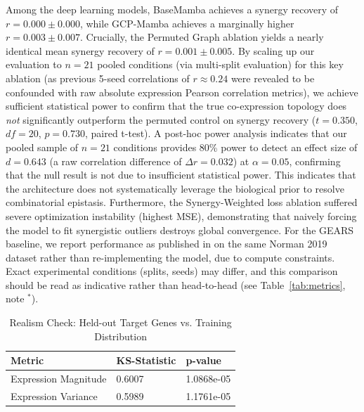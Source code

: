 \documentclass{bioinfo}
\begin{document}
Among the deep learning models, BaseMamba achieves a synergy recovery of $r = 0.000 \pm 0.000$, while GCP-Mamba achieves a marginally higher $r = 0.003 \pm 0.007$. Crucially, the Permuted Graph ablation yields a nearly identical mean synergy recovery of $r = 0.001 \pm 0.005$. By scaling up our evaluation to $n=21$ pooled conditions (via multi-split evaluation) for this key ablation (as previous 5-seed correlations of $r \approx 0.24$ were revealed to be confounded with raw absolute expression Pearson correlation metrics), we achieve sufficient statistical power to confirm that the true co-expression topology does \textit{not} significantly outperform the permuted control on synergy recovery ($t = 0.350$, $df = 20$, $p = 0.730$, paired t-test). A post-hoc power analysis indicates that our pooled sample of $n=21$ conditions provides 80\% power to detect an effect size of $d=0.643$ (a raw correlation difference of $\Delta r = 0.032$) at $\alpha = 0.05$, confirming that the null result is not due to insufficient statistical power. This indicates that the architecture does not systematically leverage the biological prior to resolve combinatorial epistasis. Furthermore, the Synergy-Weighted loss ablation suffered severe optimization instability (highest MSE), demonstrating that naively forcing the model to fit synergistic outliers destroys global convergence. For the GEARS baseline, we report performance as published in \cite{roohani2024} on the same Norman 2019 dataset rather than re-implementing the model, due to compute constraints. Exact experimental conditions (splits, seeds) may differ, and this comparison should be read as indicative rather than head-to-head (see Table~\ref{tab:metrics}, note $^*$).






\begin{table}[!htbp]
\centering
\caption{Realism Check: Held-out Target Genes vs. Training Distribution}
\label{tab:realism}
\begin{tabular}{lll}
\toprule
\textbf{Metric} & \textbf{KS-Statistic} & \textbf{p-value} \\
\midrule
Expression Magnitude & 0.6007 & 1.0868e-05 \\
Expression Variance & 0.5989 & 1.1761e-05 \\
\bottomrule
\end{tabular}
\end{table}
\end{document}
